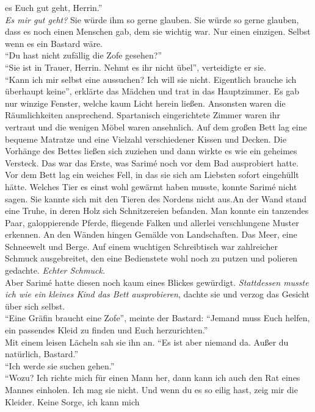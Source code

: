 es Euch gut geht, Herrin.''\\
\textit{Es mir gut geht?} Sie würde ihm so gerne glauben. Sie würde so gerne glauben, dass es noch 
einen Menschen gab, dem sie wichtig war. Nur einen einzigen. Selbst wenn es ein Bastard wäre.\\
``Du hast nicht zufällig die Zofe gesehen?''\\
``Sie ist in Trauer, Herrin. Nehmt es ihr nicht übel'', verteidigte er sie.\\
``Kann ich mir selbst eine aussuchen? Ich will sie nicht. Eigentlich brauche ich überhaupt keine'', 
erklärte das Mädchen und trat in das Hauptzimmer. Es gab nur winzige Fenster, welche kaum Licht 
herein ließen. Ansonsten waren die Räumlichkeiten ansprechend. Spartanisch eingerichtete Zimmer 
waren ihr vertraut und die wenigen Möbel waren ansehnlich. Auf dem großen Bett lag eine bequeme 
Matratze und eine Vielzahl verschiedener Kissen und Decken. Die Vorhänge des Bettes ließen sich 
zuziehen und dann wirkte es wie ein geheimes Versteck. Das war das Erste, was Sarimé noch vor dem 
Bad ausprobiert hatte. Vor dem Bett lag ein weiches Fell, in das sie sich am Liebsten sofort 
eingehüllt hätte. Welches Tier es einst wohl gewärmt haben musste, konnte Sarimé nicht sagen. Sie 
kannte sich mit den Tieren des Nordens nicht aus.An der Wand stand eine Truhe, in deren Holz  sich 
Schnitzereien befanden. Man konnte ein tanzendes Paar, galoppierende Pferde, fliegende Falken und 
allerlei verschlungene Muster erkennen. An den Wänden hingen Gemälde von Landschaften. Das Meer, 
eine Schneewelt und Berge. Auf einem wuchtigen Schreibtisch war zahlreicher Schmuck ausgebreitet, 
den eine Bedienstete wohl noch zu putzen und polieren gedachte. \textit{Echter Schmuck.}\\
Aber Sarimé hatte diesen noch kaum eines Blickes gewürdigt. \textit{Stattdessen musste ich wie ein 
kleines Kind das Bett ausprobieren}, dachte sie und verzog das Gesicht über sich selbst.\\
``Eine Gräfin braucht eine Zofe'', meinte der Bastard: ``Jemand muss Euch helfen, ein passendes 
Kleid zu finden und Euch herzurichten.''\\
Mit einem leisen Lächeln sah sie ihn an. ``Es ist aber niemand da. Außer du natürlich, Bastard.''\\
``Ich werde sie suchen gehen.''\\
``Wozu? Ich richte mich für einen Mann her, dann kann ich auch den Rat eines Mannes einholen. Ich 
mag sie nicht. Und wenn du es so eilig hast, zeig mir die Kleider. Keine Sorge, ich kann mich 

